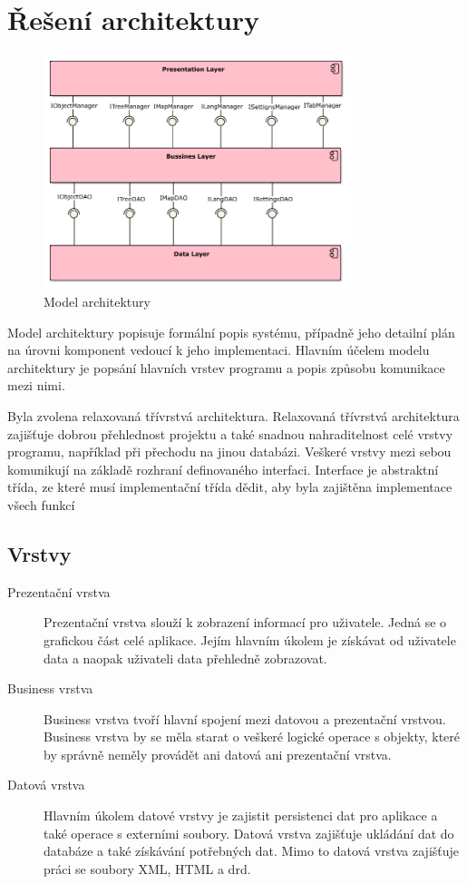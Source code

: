 \documentclass[thesis=B,czech]{resources/FITthesis}[2012/06/26]
\begin{document}
	\section{Řešení architektury}
\begin{figure}\centering
	\includegraphics[width=0.8\textwidth]{images/architektura}
	\caption[Model architektury]{Model architektury}\label{fig:architektura}
\end{figure}
Model architektury popisuje formální popis systému, případně jeho detailní plán na úrovni komponent vedoucí k jeho implementaci. Hlavním účelem modelu architektury je popsání hlavních vrstev programu a popis způsobu komunikace mezi nimi.\par

Byla zvolena relaxovaná třívrstvá architektura. Relaxovaná třívrstvá architektura zajišťuje dobrou přehlednost projektu a také snadnou nahraditelnost celé vrstvy programu, například při přechodu na jinou databázi. Veškeré vrstvy mezi sebou komunikují na základě rozhraní definovaného interfaci. Interface je abstraktní třída, ze které musí implementační třída dědit, aby byla zajištěna implementace všech funkcí

\subsection{Vrstvy}
\begin{description}
	\item[Prezentační vrstva] Prezentační vrstva slouží k zobrazení informací pro uživatele. Jedná se o grafickou část celé aplikace. Jejím hlavním úkolem je získávat od uživatele data a naopak uživateli data přehledně zobrazovat. 
	
	\item[Business vrstva] Business vrstva tvoří hlavní spojení mezi datovou a prezentační vrstvou. Business vrstva by se měla starat o veškeré logické operace s objekty, které by správně neměly provádět ani datová ani prezentační vrstva.
	
	\item[Datová vrstva] Hlavním úkolem datové vrstvy je zajistit persistenci dat pro aplikace a také operace s externími soubory. Datová vrstva zajišťuje ukládání dat do databáze a také získávání potřebných dat. Mimo to datová vrstva zajišťuje práci se soubory XML, HTML a drd. 
	
\end{description}
\end{document}
